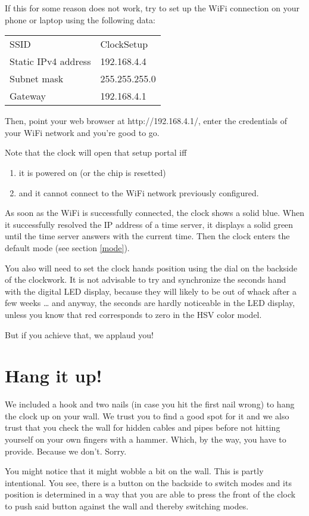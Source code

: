 \documentclass[a4paper,10pt,twocolumn]{article}
\begin{document}
If this for some reason does not work, try to set up the WiFi connection on your phone or laptop using the following
data:

\begin{tabular}[h]{ll}
SSID & ClockSetup \\
Static IPv4 address & 192.168.4.4 \\
Subnet mask & 255.255.255.0 \\
Gateway & 192.168.4.1 
\end{tabular}

Then, point your web browser at http://192.168.4.1/, enter the credentials 
of your WiFi network and you're good to go.

Note that the clock will open that setup portal iff

\begin{enumerate}
 \item it is powered on (or the chip is resetted)
 \item and it cannot connect to the WiFi network previously configured.
\end{enumerate}

As soon as the WiFi is successfully connected, the clock shows a solid blue. When it
successfully resolved the IP address of a time server, it displays a solid green until
the time server answers with the current time. Then the clock enters the default mode
(see section \ref{mode}).

You also will need to set the clock hands position using the dial on the backside 
of the clockwork. It is not advisable to try and synchronize the seconds hand with the 
digital LED display, because they will likely to be out of whack after a few weeks \dots{} and
anyway, the seconds are hardly noticeable in the LED display, unless you know that red
corresponds to zero in the HSV color model.

But if you achieve that, we applaud you!

\section{Hang it up!}
\label{hangup}
We included a hook and two nails (in case you hit the first nail wrong) to hang the clock up 
on your wall. We trust you to find a good spot for it and we also trust that you check the
wall for hidden cables and pipes before not hitting yourself on your own fingers with a 
hammer. Which, by the way, you have to provide. Because we don't. Sorry.

You might notice that it might wobble a bit on the wall. This is partly intentional. You 
see, there is a button on the backside to switch modes and its position is determined in
a way that you are able to press the front of the clock to push said button against the wall
and thereby switching modes. 
\end{document}
